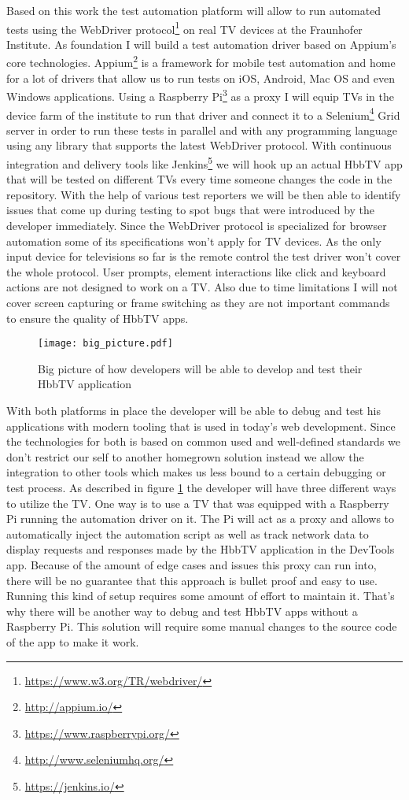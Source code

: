 Based on this work the test automation platform will allow to run automated tests using the WebDriver protocol\footnote{\url{https://www.w3.org/TR/webdriver/}} on real TV devices at the Fraunhofer Institute. As foundation I will build a test automation driver based on Appium's core technologies. Appium\footnote{\url{http://appium.io/}} is a framework for mobile test automation and home for a lot of drivers that allow us to run tests on iOS, Android, Mac OS and even Windows applications. Using a Raspberry Pi\footnote{\url{https://www.raspberrypi.org/}} as a proxy I will equip TVs in the device farm of the institute to run that driver and connect it to a Selenium\footnote{\url{http://www.seleniumhq.org/}} Grid server in order to run these tests in parallel and with any programming language using any library that supports the latest WebDriver protocol. With continuous integration and delivery tools like Jenkins\footnote{\url{https://jenkins.io/}} we will hook up an actual HbbTV app that will be tested on different TVs every time someone changes the code in the repository. With the help of various test reporters we will be then able to identify issues that come up during testing to spot bugs that were introduced by the developer immediately. Since the WebDriver protocol is specialized for browser automation some of its specifications won't apply for TV devices. As the only input device for televisions so far is the remote control the test driver won't cover the whole protocol. User prompts, element interactions like click and keyboard actions are not designed to work on a TV. Also due to time limitations I will not cover screen capturing or frame switching as they are not important commands to ensure the quality of HbbTV apps.

\begin{figure}[htb]
  \centering
  \texttt{[image: big\_picture.pdf]}
  \caption{Big picture of how developers will be able to develop and test their HbbTV application}\label{fig:bigpicture}
\end{figure}

With both platforms in place the developer will be able to debug and test his applications with modern tooling that is used in today's web development. Since the technologies for both is based on common used and well-defined standards we don't restrict our self to another homegrown solution instead we allow the integration to other tools which makes us less bound to a certain debugging or test process. As described in figure \ref{fig:bigpicture} the developer will have three different ways to utilize the TV. One way is to use a TV that was equipped with a Raspberry Pi running the automation driver on it. The Pi will act as a proxy and allows to automatically inject the automation script as well as track network data to display requests and responses made by the HbbTV application in the DevTools app. Because of the amount of edge cases and issues this proxy can run into, there will be no guarantee that this approach is bullet proof and easy to use. Running this kind of setup requires some amount of effort to maintain it. That's why there will be another way to debug and test HbbTV apps without a Raspberry Pi. This solution will require some manual changes to the source code of the app to make it work.

